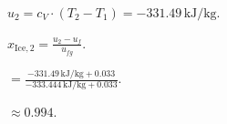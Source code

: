 \( u_2 = c_V \cdot (T_2 - T_1) = -331.49 \, \text{kJ/kg} \).  

\( x_{\text{Ice},2} = \frac{u_2 - u_f}{u_{fg}} \).  

\( = \frac{-331.49 \, \text{kJ/kg} + 0.033}{-333.444 \, \text{kJ/kg} + 0.033} \).  

\( \approx 0.994 \).